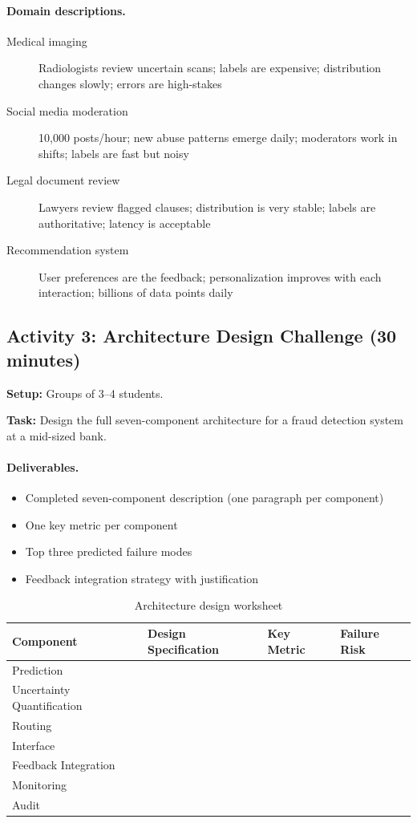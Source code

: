 \paragraph{Domain descriptions.}
\begin{description}
    \item[Medical imaging] Radiologists review uncertain scans; labels are expensive; distribution changes slowly; errors are high-stakes
    \item[Social media moderation] 10,000 posts/hour; new abuse patterns emerge daily; moderators work in shifts; labels are fast but noisy
    \item[Legal document review] Lawyers review flagged clauses; distribution is very stable; labels are authoritative; latency is acceptable
    \item[Recommendation system] User preferences are the feedback; personalization improves with each interaction; billions of data points daily
\end{description}

\subsection{Activity 3: Architecture Design Challenge (30 minutes)}

\textbf{Setup:} Groups of 3--4 students.

\textbf{Task:} Design the full seven-component architecture for a fraud detection system at a mid-sized bank.

\paragraph{Deliverables.}
\begin{itemize}
    \item Completed seven-component description (one paragraph per component)
    \item One key metric per component
    \item Top three predicted failure modes
    \item Feedback integration strategy with justification
\end{itemize}

\begin{table}[htbp]
\caption{Architecture design worksheet}
\label{tab:architecture-worksheet}
\centering
\begin{tabular}{@{}p{3.5cm}p{3cm}p{3cm}p{2.5cm}@{}}
\toprule
\textbf{Component} & \textbf{Design Specification} & \textbf{Key Metric} & \textbf{Failure Risk} \\
\midrule
Prediction & & & \\[6pt]
Uncertainty Quantification & & & \\[6pt]
Routing & & & \\[6pt]
Interface & & & \\[6pt]
Feedback Integration & & & \\[6pt]
Monitoring & & & \\[6pt]
Audit & & & \\
\bottomrule
\end{tabular}
\end{table}

